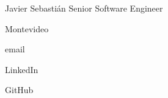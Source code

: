 \Header
  {Javier Sebastián}
  {Senior Software Engineer}
  {\ContactStacked}
  {
    Montevideo\par
    email\par
    LinkedIn\par
    GitHub
  }